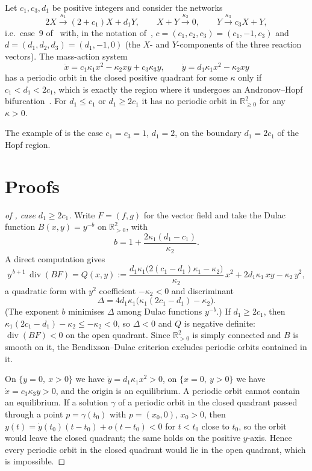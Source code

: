 \documentclass[11pt,a4paper]{report}
\begin{document}
\begin{theorem}\label{thm:family}
Let \(c_1,c_3,d_1\) be positive integers and consider the networks
\[
2X\xrightarrow{\kappa_1}(2+c_1)X+d_1Y,\qquad X+Y\xrightarrow{\kappa_2}0,\qquad Y\xrightarrow{\kappa_3}c_3X+Y,
\]
i.e.\ case~9 of~\autocite[Theorem~9]{BBH2024} with, in the notation of~\autocite[(13)]{BBH2024},
\(c=(c_1,c_2,c_3)=(c_1,-1,c_3)\) and \(d=(d_1,d_2,d_3)=(d_1,-1,0)\) (the \(X\)- and \(Y\)-components of the three
reaction vectors). The mass-action system
\[
\dot x=c_1\kappa_1x^2-\kappa_2xy+c_3\kappa_3y,\qquad \dot y=d_1\kappa_1x^2-\kappa_2xy
\]
has a periodic orbit in the closed positive quadrant for some \(\kappa\) only if \(c_1<d_1<2c_1\), which is exactly
the region where it undergoes an Andronov--Hopf bifurcation~\autocite[Theorem~9]{BBH2024}. For \(d_1\le c_1\) or
\(d_1\ge 2c_1\) it has no periodic orbit in \(\mathbb R^2_{\ge0}\) for any \(\kappa>0\).
\end{theorem}

The example of  is the case \(c_1=c_3=1\), \(d_1=2\), on the boundary \(d_1=2c_1\) of the Hopf
region.

\section{Proofs}

\begin{proof}[of , case \(d_1\ge2c_1\)]
Write \(F=(f,g)\) for the vector field and take the Dulac function \(B(x,y)=y^{-b}\) on \(\mathbb R^2_{>0}\), with
\[
b=1+\frac{2\kappa_1(d_1-c_1)}{\kappa_2}.
\]
A direct computation gives
\[
y^{\,b+1}\,\operatorname{div}(BF)=Q(x,y):=\frac{d_1\kappa_1\bigl(2(c_1-d_1)\kappa_1-\kappa_2\bigr)}{\kappa_2}\,x^2
+2d_1\kappa_1\,xy-\kappa_2\,y^2 ,
\]
a quadratic form with \(y^2\) coefficient \(-\kappa_2<0\) and discriminant
\[
\Delta=4d_1\kappa_1\bigl(\kappa_1(2c_1-d_1)-\kappa_2\bigr).
\]
(The exponent \(b\) minimises \(\Delta\) among Dulac functions \(y^{-b}\).) If \(d_1\ge 2c_1\), then
\(\kappa_1(2c_1-d_1)-\kappa_2\le-\kappa_2<0\), so \(\Delta<0\) and \(Q\) is negative definite: \(\operatorname{div}(BF)<0\)
on the open quadrant. Since \(\mathbb R^2_{>0}\) is simply connected and \(B\) is smooth on it, the Bendixson--Dulac
criterion excludes periodic orbits contained in it.

On \(\{y=0,\ x>0\}\) we have \(\dot y=d_1\kappa_1x^2>0\), on \(\{x=0,\ y>0\}\) we have \(\dot x=c_3\kappa_3y>0\), and the
origin is an equilibrium. A periodic orbit cannot contain an equilibrium. If a solution \(\gamma\) of a periodic orbit
in the closed quadrant passed through a point \(p=\gamma(t_0)\) with \(p=(x_0,0)\), \(x_0>0\), then
\(y(t)=\dot y(t_0)(t-t_0)+o(t-t_0)<0\) for \(t<t_0\) close to \(t_0\), so the orbit would leave the closed quadrant;
the same holds on the positive \(y\)-axis. Hence every periodic orbit in the closed quadrant would lie in the open
quadrant, which is impossible.
\end{proof}
\end{document}
